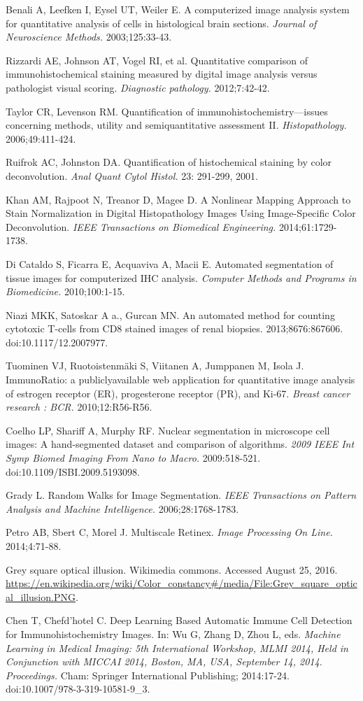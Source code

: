\documentclass[12pt]{article}
\begin{document}
\noindent[22] Benali A, Leefken I, Eysel UT, Weiler E. A computerized image analysis system for quantitative analysis of cells in histological brain sections. \textit{Journal of Neuroscience Methods.} 2003;125:33-43.

\noindent[23] Rizzardi AE, Johnson AT, Vogel RI, et al. Quantitative comparison of immunohistochemical staining measured by digital image analysis versus pathologist visual scoring. \textit{Diagnostic pathology.} 2012;7:42-42.

\noindent[24] Taylor CR, Levenson RM. Quantification of immunohistochemistry---issues concerning methods, utility and semiquantitative assessment II. \textit{Histopathology.} 2006;49:411-424.

\noindent[25] Ruifrok AC, Johnston DA. Quantification of histochemical staining by color deconvolution. \textit{Anal Quant Cytol Histol.} 23: 291-299, 2001.

\noindent[26] Khan AM, Rajpoot N, Treanor D, Magee D. A Nonlinear Mapping Approach to Stain Normalization in Digital Histopathology Images Using Image-Specific Color Deconvolution. \textit{IEEE Transactions on Biomedical Engineering.} 2014;61:1729-1738.

\noindent[27] Di Cataldo S, Ficarra E, Acquaviva A, Macii E. Automated segmentation of tissue images for computerized IHC analysis. \textit{Computer Methods and Programs in Biomedicine.} 2010;100:1-15.

\noindent[28] Niazi MKK, Satoskar A a., Gurcan MN. An automated method for counting cytotoxic T-cells from CD8 stained images of renal biopsies. 2013;8676:867606. doi:10.1117/12.2007977.

\noindent[29] Tuominen VJ, Ruotoistenmäki S, Viitanen A, Jumppanen M, Isola J. ImmunoRatio: a publiclyavailable web application for quantitative image analysis of estrogen receptor (ER), progesterone receptor (PR), and Ki-67. \textit{Breast cancer research : BCR.} 2010;12:R56-R56.

\noindent[30] Coelho LP, Shariff A, Murphy RF. Nuclear segmentation in microscope cell images: A hand-segmented dataset and comparison of algorithms. \textit{2009 IEEE Int Symp Biomed Imaging From Nano to Macro.} 2009:518-521. doi:10.1109/ISBI.2009.5193098.

\noindent[31] Grady L. Random Walks for Image Segmentation. \textit{IEEE Transactions on Pattern Analysis and Machine Intelligence.} 2006;28:1768-1783.

\noindent[32] Petro AB, Sbert C, Morel J. Multiscale Retinex. \textit{Image Processing On Line.} 2014;4:71-88.

\noindent[33] Grey square optical illusion. Wikimedia commons. Accessed August 25, 2016. \url{https://en.wikipedia.org/wiki/Color_constancy#/media/File:Grey_square_optical_illusion.PNG}. 

\noindent[34] Chen T, Chefd'hotel C. Deep Learning Based Automatic Immune Cell Detection for Immunohistochemistry Images. In: Wu G, Zhang D, Zhou L, eds. \textit{Machine Learning in Medical Imaging: 5th International Workshop, MLMI 2014, Held in Conjunction with MICCAI 2014, Boston, MA, USA, September 14, 2014. Proceedings.} Cham: Springer International Publishing; 2014:17-24. doi:10.1007/978-3-319-10581-9\_3.
\end{document}
